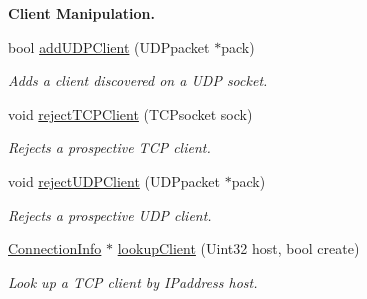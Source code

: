 \begin{Indent}{\bf Client Manipulation.}\par
\begin{DoxyCompactItemize}
\item 
bool \hyperlink{classNetManager_aff05c27b852dddd386e788bed7fa6d12}{add\-U\-D\-P\-Client} (U\-D\-Ppacket $\ast$pack)
\begin{DoxyCompactList}\small\item\em Adds a client discovered on a U\-D\-P socket. \end{DoxyCompactList}\item 
void \hyperlink{classNetManager_ab7048f28558dec8046b9536ad6c094f8}{reject\-T\-C\-P\-Client} (T\-C\-Psocket sock)
\begin{DoxyCompactList}\small\item\em Rejects a prospective T\-C\-P client. \end{DoxyCompactList}\item 
void \hyperlink{classNetManager_aae62147d4b4d06cccd992f30b6669ea5}{reject\-U\-D\-P\-Client} (U\-D\-Ppacket $\ast$pack)
\begin{DoxyCompactList}\small\item\em Rejects a prospective U\-D\-P client. \end{DoxyCompactList}\item 
\hyperlink{structConnectionInfo}{Connection\-Info} $\ast$ \hyperlink{classNetManager_afd504716ee545b2961db863abc7b229a}{lookup\-Client} (Uint32 host, bool create)
\begin{DoxyCompactList}\small\item\em Look up a T\-C\-P client by I\-Paddress host. \end{DoxyCompactList}\end{DoxyCompactItemize}
\end{Indent}
